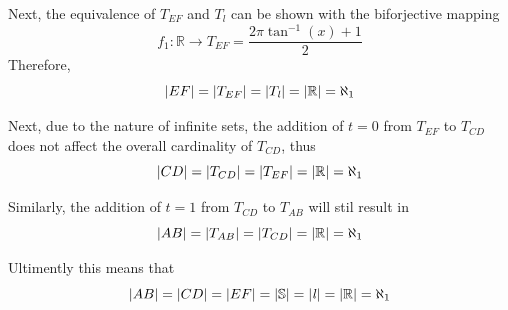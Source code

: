 \documentclass[]{article}
\newcommand{\R}{\mathbb{R}}
\begin{document}
Next, the equivalence of $T_{EF}$ and $T_\mathit{l}$ can be shown with the biforjective mapping 
$$f_1 : \R \rightarrow T_{EF} = \frac{2 \pi \tan^{-1}(x) + 1}{2}$$
Therefore,
$$\abs{EF} = \abs{T_{EF}} = \abs{T_{\mathit{l}}} = \abs{\R} = \aleph_1$$

Next, due to the nature of infinite sets, the addition of $t=0$ from $T_{EF}$ to $T_{CD}$ 
does not affect the overall cardinality of $T_{CD}$, thus
$$\abs{CD} = \abs{T_{CD}} = \abs{T_{EF}} = \abs{\R} = \aleph_1$$

Similarly, the addition of $t=1$ from $T_{CD}$ to $T_{AB}$ will stil result in 
$$\abs{AB} = \abs{T_{AB}} = \abs{T_{CD}} = \abs{\R} = \aleph_1$$

Ultimently this means that
$$\abs{AB} = \abs{CD} = \abs{EF} = \abs{\mathbb{S}} = \abs{\mathit{l}} = \abs{\R} = \aleph_1$$
\end{document}
